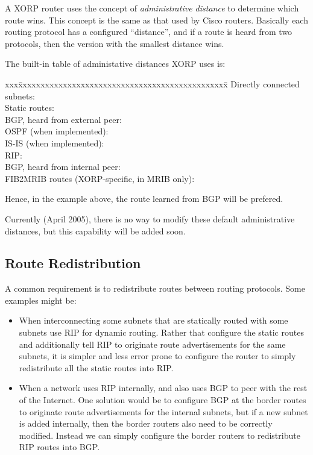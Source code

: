 A XORP router uses the concept of {\it administrative distance} to
determine which route wins.  This concept is the same as that used by
Cisco routers.  Basically each routing protocol has a configured
``distance'', and if a route is heard from two protocols, then the
version with the smallest distance wins.

The built-in table of administative distances XORP uses is:
\begin{tabbing}
xxx\=xxxxxxxxxxxxxxxxxxxxxxxxxxxxxxxxxxxxxxxxxxxxxxx\=\kill
\>Directly connected subnets: \\
\>Static routes:\\
\>BGP, heard from external peer:\\
\>OSPF (when implemented):\\
\>IS-IS (when implemented):\\
\>RIP:\\
\>BGP, heard from internal peer:\\
\>FIB2MRIB routes (XORP-specific, in MRIB only):
\end{tabbing}
Hence, in the example above, the route learned from BGP will be prefered.

Currently (April 2005), there is no way to modify these default
administrative distances, but this capability will be added soon.

\subsection{Route Redistribution}

A common requirement is to redistribute routes between routing
protocols.  Some examples might be:

\begin{itemize}
\item When interconnecting some subnets that are statically routed
  with some subnets use RIP for dynamic routing.  Rather
  that configure the static routes and additionally tell RIP to
  originate route advertisements for the same subnets, it is simpler
  and less error prone to configure the router to simply redistribute
  all the static routes into RIP.
\item When a network uses RIP internally, and also uses BGP to
  peer with the rest of the Internet.  One solution would be to
  configure BGP at the border routes to originate route advertisements
  for the internal subnets, but if a new subnet is added internally,
  then the border routers also need to be correctly modified.  Instead
  we can simply configure the border routers to redistribute RIP
  routes into BGP.  
\end{itemize}

